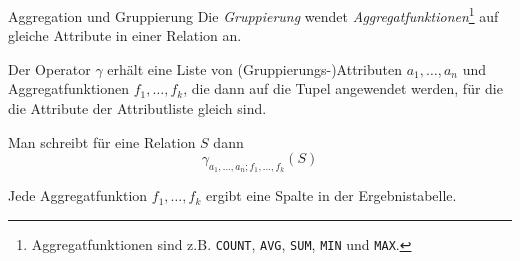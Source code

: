 \begin{defi}{Aggregation und Gruppierung}
    Die \emph{Gruppierung} wendet \emph{Aggregatfunktionen}\footnote{Aggregatfunktionen sind z.B. \texttt{COUNT}, \texttt{AVG}, \texttt{SUM}, \texttt{MIN} und \texttt{MAX}.} auf gleiche Attribute in einer Relation an.

    Der Operator $\gamma$ erhält eine Liste von (Gruppierungs-)Attributen $a_1, \ldots, a_n$ und Aggregatfunktionen $f_1, \ldots, f_k$, die dann auf die Tupel angewendet werden, für die die Attribute der Attributliste gleich sind.

    Man schreibt für eine Relation $S$ dann
    \[
        \gamma_{a_1, \ldots, a_n; f_1, \ldots, f_k}(S)
    \]

    Jede Aggregatfunktion $f_1, \ldots, f_k$ ergibt eine Spalte in der Ergebnistabelle.
\end{defi}

